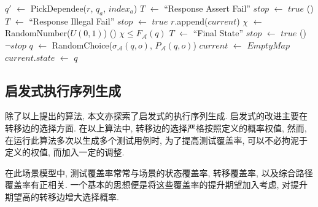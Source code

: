 \begin{algorithm}
{{{{{                                    
                                    $q'$ $\gets$ PickDependee($r$, $q_a$, $index_a$)\;
                                     {
                                    	$T$ $\gets$ ``Response Assert Fail''\;
                                        $stop$ $\gets$ $true$\;
                                    }
                                } \Else() {
                                	 {
                                    	$T$ $\gets$ ``Response Illegal Fail''\;
                                        $stop$ $\gets$ $true$\;
                                    }
                                }
                            }
                        }
                    }
                    $r$.append($current$)\;
                     {
                    	$\chi$ $\gets$ RandomNumber($U(0,1)$)\;
                        \If() {$\chi \le F_{\mathcal{A}}(q)$} {
                        	$T$ $\gets$ ``Final State''\;
                            $stop$ $\gets$ $true$\;
                        }
                    }
                	\If() {$\neg stop$} {
                    	$q$ $\gets$ RandomChoice($\sigma_{\mathcal{A}}(q,o)$, $P_{\mathcal{A}}(q,o)$)\;
                        $current$ $\gets$ $EmptyMap$\;
                        $current.state$ $\gets$ $q$\;
                    }
                }
    
                \label{algo:seqgen}
              \end{algorithm}
        
        \subsection{启发式执行序列生成}
            除了以上提出的算法, 本文亦探索了启发式的执行序列生成. 启发式的改进主要在转移边的选择方面. 在以上算法中, 转移边的选择严格按照定义的概率权值, 然而, 在运行此算法多次以生成多个测试用例时, 为了提高测试覆盖率, 可以不必拘泥于定义的权值, 而加入一定的调整.
            
            在此场景模型中, 测试覆盖率常常与场景的状态覆盖率, 转移覆盖率, 以及综合路径覆盖率有正相关. 一个基本的思想便是将这些覆盖率的提升期望加入考虑, 对提升期望高的转移边增大选择概率.
            

